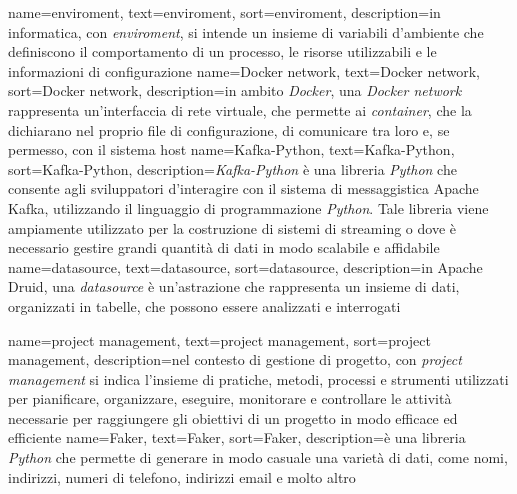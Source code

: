 {
    name={enviroment},
    text=enviroment,
    sort=enviroment,
    description={in informatica, con \textit{enviroment}, si intende un insieme di variabili d'ambiente che definiscono il comportamento di un processo, le risorse utilizzabili e le informazioni di configurazione}
}
{
    name={Docker network},
    text=Docker network,
    sort=Docker network,
    description={in ambito \textit{Docker}, una \textit{Docker network} rappresenta un'interfaccia di rete virtuale, che permette ai \textit{container}, che la dichiarano nel proprio file di configurazione, di comunicare tra loro e, se permesso, con il sistema host}
}
{
    name={Kafka-Python},
    text=Kafka-Python,
    sort=Kafka-Python,
    description={\textit{Kafka-Python} è una libreria \textit{Python} che consente agli sviluppatori d'interagire con il sistema di messaggistica Apache Kafka, utilizzando il linguaggio di programmazione \textit{Python}. Tale libreria viene ampiamente utilizzato per la costruzione di sistemi di streaming o dove è necessario gestire grandi quantità di dati in modo scalabile e affidabile}
}
{
    name={datasource},
    text=datasource,
    sort=datasource,
    description={in Apache Druid, una \textit{datasource} è un'astrazione che rappresenta un insieme di dati, organizzati in tabelle, che possono essere analizzati e interrogati}
}

{
    name={project management},
    text=project management,
    sort=project management,
    description={nel contesto di gestione di progetto, con \textit{project management} si indica l'insieme di pratiche, metodi, processi e strumenti utilizzati per pianificare, organizzare, eseguire, monitorare e controllare le attività necessarie per raggiungere gli obiettivi di un progetto in modo efficace ed efficiente}
}
{
    name={Faker},
    text=Faker,
    sort=Faker,
    description={è una libreria \textit{Python} che permette di generare in modo casuale una varietà di dati, come nomi, indirizzi, numeri di telefono, indirizzi email e molto altro}
}